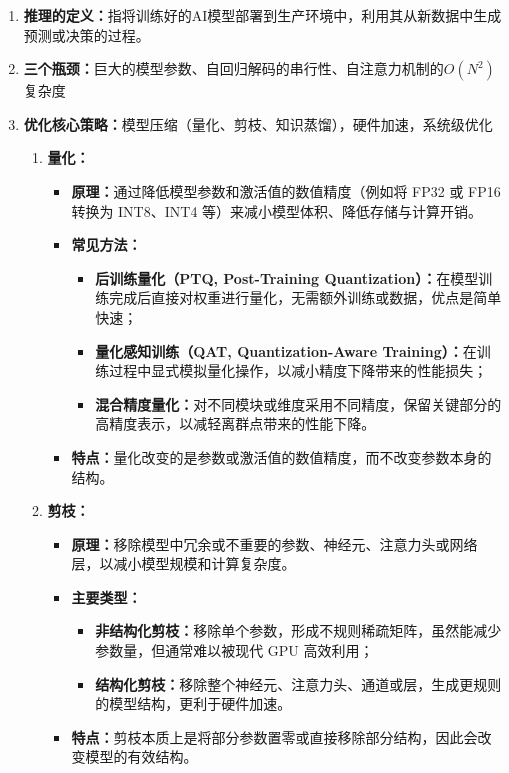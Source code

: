 \documentclass[../main.tex]{subfiles}
\begin{document}
\begin{enumerate}
    \item \textbf{推理的定义：}指将训练好的AI模型部署到生产环境中，利用其从新数据中生成预测或决策的过程。
    \item \textbf{三个瓶颈：}巨大的模型参数、自回归解码的串行性、自注意力机制的$O(N^2)$复杂度
    \item \textbf{优化核心策略：}模型压缩（量化、剪枝、知识蒸馏），硬件加速，系统级优化
    \begin{enumerate}
        \item \textbf{量化：}
    \begin{itemize}
        \item \textbf{原理：}通过降低模型参数和激活值的数值精度（例如将 FP32 或 FP16 转换为 INT8、INT4 等）来减小模型体积、降低存储与计算开销。
        \item \textbf{常见方法：}
        \begin{itemize}
            \item \textbf{后训练量化（PTQ, Post-Training Quantization）：}在模型训练完成后直接对权重进行量化，无需额外训练或数据，优点是简单快速；
            \item \textbf{量化感知训练（QAT, Quantization-Aware Training）：}在训练过程中显式模拟量化操作，以减小精度下降带来的性能损失；
            \item \textbf{混合精度量化：}对不同模块或维度采用不同精度，保留关键部分的高精度表示，以减轻离群点带来的性能下降。
        \end{itemize}
        \item \textbf{特点：}量化改变的是参数或激活值的数值精度，而不改变参数本身的结构。
    \end{itemize}

    \item \textbf{剪枝：}
    \begin{itemize}
        \item \textbf{原理：}移除模型中冗余或不重要的参数、神经元、注意力头或网络层，以减小模型规模和计算复杂度。
        \item \textbf{主要类型：}
        \begin{itemize}
            \item \textbf{非结构化剪枝：}移除单个参数，形成不规则稀疏矩阵，虽然能减少参数量，但通常难以被现代 GPU 高效利用；
            \item \textbf{结构化剪枝：}移除整个神经元、注意力头、通道或层，生成更规则的模型结构，更利于硬件加速。
        \end{itemize}
        \item \textbf{特点：}剪枝本质上是将部分参数置零或直接移除部分结构，因此会改变模型的有效结构。
    \end{itemize}


\end{enumerate}
\end{enumerate}
\end{document}
